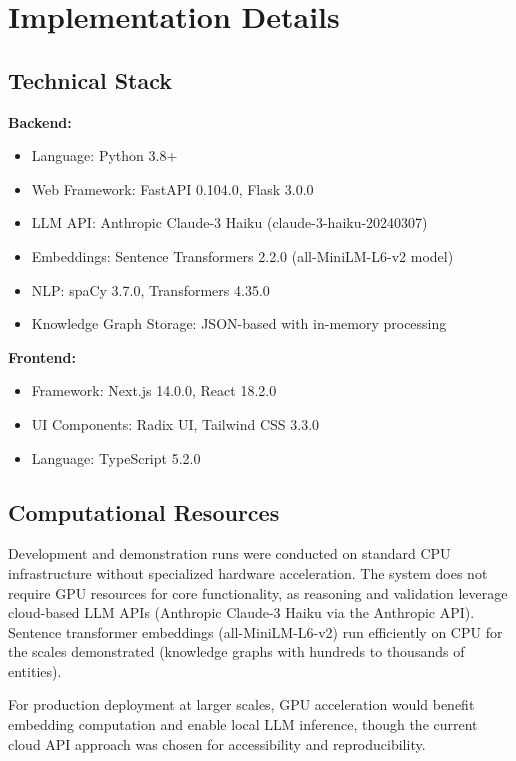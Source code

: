 \documentclass{article}
\begin{document}



\appendix

\section{Implementation Details}
\label{appendix:implementation}

\subsection{Technical Stack}

\textbf{Backend:}
\begin{itemize}
\item Language: Python 3.8+
\item Web Framework: FastAPI 0.104.0, Flask 3.0.0
\item LLM API: Anthropic Claude-3 Haiku (claude-3-haiku-20240307)
\item Embeddings: Sentence Transformers 2.2.0 (all-MiniLM-L6-v2 model)
\item NLP: spaCy 3.7.0, Transformers 4.35.0
\item Knowledge Graph Storage: JSON-based with in-memory processing
\end{itemize}

\textbf{Frontend:}
\begin{itemize}
\item Framework: Next.js 14.0.0, React 18.2.0
\item UI Components: Radix UI, Tailwind CSS 3.3.0
\item Language: TypeScript 5.2.0
\end{itemize}

\subsection{Computational Resources}

Development and demonstration runs were conducted on standard CPU infrastructure without specialized hardware acceleration. The system does not require GPU resources for core functionality, as reasoning and validation leverage cloud-based LLM APIs (Anthropic Claude-3 Haiku via the Anthropic API). Sentence transformer embeddings (all-MiniLM-L6-v2) run efficiently on CPU for the scales demonstrated (knowledge graphs with hundreds to thousands of entities).

For production deployment at larger scales, GPU acceleration would benefit embedding computation and enable local LLM inference, though the current cloud API approach was chosen for accessibility and reproducibility.
\end{document}

